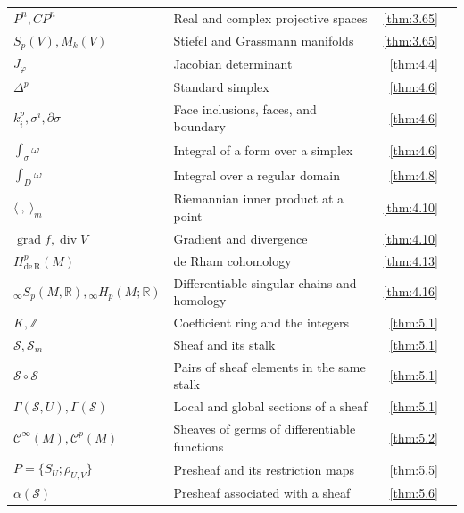 {\begin{longtable}{@{}>{\raggedright\arraybackslash}p{.39\linewidth}>{\raggedright\arraybackslash}p{.39\linewidth}r r@{}}
$P^{n},\allowbreak CP^{n}$ & Real and complex projective spaces & \ref{thm:3.65} & \pageref{thm:3.65} \\
$S_{p}(V),\allowbreak M_{k}(V)$ & Stiefel and Grassmann manifolds & \ref{thm:3.65} & \pageref{thm:3.65} \\
$J_\varphi$ & Jacobian determinant & \ref{thm:4.4} & \pageref{thm:4.4} \\
$\Delta^{p}$ & Standard simplex & \ref{thm:4.6} & \pageref{thm:4.6} \\
$k_{i}^{p},\allowbreak \sigma^{i},\allowbreak \partial\sigma$ & Face inclusions, faces, and boundary & \ref{thm:4.6} & \pageref{thm:4.6} \\
$\int_\sigma\omega$ & Integral of a form over a simplex & \ref{thm:4.6} & \pageref{thm:4.6} \\
$\int_{D}\omega$ & Integral over a regular domain & \ref{thm:4.8} & \pageref{thm:4.8} \\
$\langle\ ,\allowbreak \ \rangle_{m}$ & Riemannian inner product at a point & \ref{thm:4.10} & \pageref{thm:4.10} \\
$\operatorname{grad}f,\allowbreak \operatorname{div}V$ & Gradient and divergence & \ref{thm:4.10} & \pageref{thm:4.10} \\
$H_{\mathrm{de\,\allowbreak R}}^p(M)$ & de Rham cohomology & \ref{thm:4.13} & \pageref{thm:4.13} \\
${}_\infty S_p(M,\allowbreak \mathbb R),\allowbreak {}_\infty H_p(M;\mathbb R)$ & Differentiable singular chains and homology & \ref{thm:4.16} & \pageref{thm:4.16} \\
$K,\allowbreak \mathbb Z$ & Coefficient ring and the integers & \ref{thm:5.1} & \pageref{thm:5.1} \\
$\mathcal S,\allowbreak \mathcal S_m$ & Sheaf and its stalk & \ref{thm:5.1} & \pageref{thm:5.1} \\
$\mathcal S\circ\mathcal S$ & Pairs of sheaf elements in the same stalk & \ref{thm:5.1} & \pageref{thm:5.1} \\
$\Gamma(\mathcal S,\allowbreak U),\allowbreak \Gamma(\mathcal S)$ & Local and global sections of a sheaf & \ref{thm:5.1} & \pageref{thm:5.1} \\
$\mathcal C^\infty(M),\allowbreak \mathcal C^p(M)$ & Sheaves of germs of differentiable functions & \ref{thm:5.2} & \pageref{thm:5.2} \\
$P=\{S_{U};\rho_{U,\allowbreak V}\}$ & Presheaf and its restriction maps & \ref{thm:5.5} & \pageref{thm:5.5} \\
$\alpha(\mathcal S)$ & Presheaf associated with a sheaf & \ref{thm:5.6} & \pageref{thm:5.6} \\

\end{longtable}}
